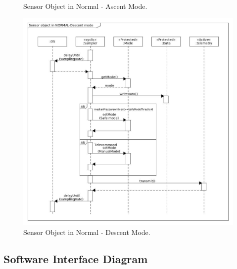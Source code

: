 \documentclass[a4paper,12pt,oneside]{article} %
\providecommand{\DIFaddbeginFL}{} %
\providecommand{\DIFaddendFL}{} %
\providecommand{\DIFdelbeginFL}{} %
\providecommand{\DIFdelendFL}{} %
\newcommand{\DIFscaledelfig}{0.5}
\newlength{\DIFdelgraphicswidth} %
\newlength{\DIFdelgraphicsheight} %
\newcommand{\DIFaddincludegraphics}[2][]{{\color{blue}\fbox{\DIFOincludegraphics[#1]{#2}}}} %
\newcommand{\DIFdelincludegraphics}[2][]{%
\sbox{\DIFdelgraphicsbox}{\DIFOincludegraphics[#1]{#2}}%
\settoboxwidth{\DIFdelgraphicswidth}{\DIFdelgraphicsbox} %
\settoboxtotalheight{\DIFdelgraphicsheight}{\DIFdelgraphicsbox} %
\scalebox{\DIFscaledelfig}{%
\parbox[b]{\DIFdelgraphicswidth}{\usebox{\DIFdelgraphicsbox}\\[-\baselineskip] \rule{\DIFdelgraphicswidth}{0em}}\llap{\resizebox{\DIFdelgraphicswidth}{\DIFdelgraphicsheight}{%
\setlength{\unitlength}{\DIFdelgraphicswidth}%
\begin{picture}(1,1)%
\thicklines\linethickness{2pt} %
{\color[rgb]{1,0,0}\put(0,0){\framebox(1,1){}}}%
{\color[rgb]{1,0,0}\put(0,0){\line( 1,1){1}}}%
{\color[rgb]{1,0,0}\put(0,1){\line(1,-1){1}}}%
\end{picture}%
}\hspace*{3pt}}} %
} %
\DeclareRobustCommand{\DIFaddbeginFL}{\DIFOaddbeginFL \let\includegraphics\DIFaddincludegraphics} %
\DeclareRobustCommand{\DIFaddendFL}{\DIFOaddendFL \let\includegraphics\DIFOincludegraphics} %
\DeclareRobustCommand{\DIFdelbeginFL}{\DIFOdelbeginFL \let\includegraphics\DIFdelincludegraphics} %
\DeclareRobustCommand{\DIFdelendFL}{\DIFOaddendFL \let\includegraphics\DIFOincludegraphics} %
\begin{document}
\begin{appendices}
\begin{landscape}
\begin{figure}[H]
    \DIFaddendFL \caption{Sensor Object in Normal - Ascent Mode.}
    \label{sensorb}
\end{figure}
\begin{figure}[H]
    \centering
    \DIFdelbeginFL %
\DIFdelendFL \DIFaddbeginFL \includegraphics[height=0.9\textwidth]{appendix/img/softwareDiagrams/Sequance-Diagram-descent-Mode.jpg}
    \DIFaddendFL \caption{Sensor Object in Normal - Descent Mode.}
    \label{sensorc}
\end{figure}
\end{landscape}
\newpage
\subsection{Software Interface Diagram} \label{sec:appC}

\end{appendices}
\end{document}

